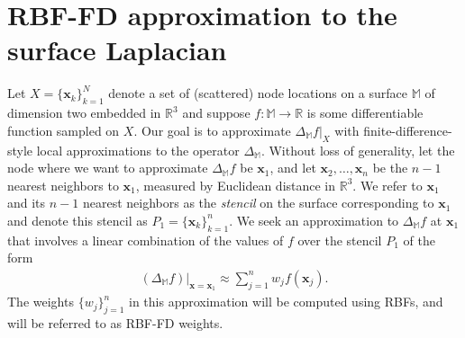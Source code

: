 \documentclass[smallextended]{svjour3}
\newcommand{\vX}{ \mathbf{x} }
\newcommand{\lf}{\left}
\newcommand{\rt}{\right}
\begin{document}
\section{RBF-FD approximation to the surface Laplacian}
\label{sec:MoL}

Let $X = \{\vX_k\}_{k=1}^N$ denote a set of (scattered) node locations on a surface $\mathbb{M}$ of dimension two embedded in $\mathbb{R}^3$ and suppose $f:\mathbb{M}\rightarrow\mathbb{R}$ is some differentiable function sampled on $X$. Our goal is to approximate $\lf.\Delta_{\mathbb{M}} f\rt|_X$ with finite-difference-style local approximations to the operator $\Delta_{\mathbb{M}}$. Without loss of generality,
let the node where we want to approximate $\Delta_{\mathbb{M}}f$ be
$\vX_1$, and let $\vX_2,\ldots,\vX_n$ be the $n-1$ nearest
neighbors to $\vX_1$, measured by Euclidean distance in $\mathbb{R}^3$. We refer to $\vX_1$ and its $n-1$ nearest neighbors as the \emph{stencil} on the surface corresponding to $\vX_1$ and denote this stencil as $P_1 = \{\vX_k\}_{k=1}^n$.  We seek an approximation to $\Delta_{\mathbb{M}}f$ at $\vX_1$ that involves a linear combination of the values of $f$ over the stencil $P_1$ of the form
\begin{align} 
(\Delta_{\mathbb{M}}f)\bigr|_{\vX=\vX_1} \approx \sum_{j=1}^{n} w_j f(\vX_j).
\label{eq:fd_weights}
\end{align}
The weights $\{w_j\}_{j=1}^n$ in this approximation will be computed using RBFs, and will be referred to as RBF-FD weights.
\end{document}
